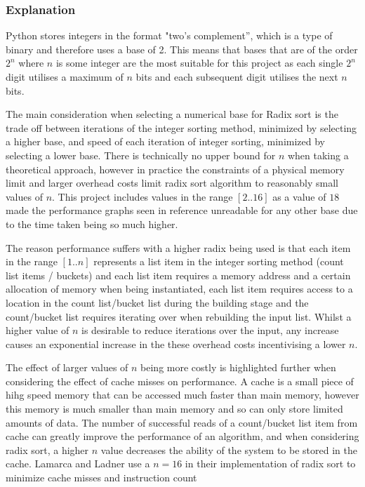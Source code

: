 \documentclass[12pt]{article}
\begin{document}
	\subsubsection{Explanation}
	\label{ssec:radixexplanation}
	Python stores integers in the format "two’s complement”, which is a type of binary and therefore uses a base of 2. This means that bases that are of the order $2^n$ where $n$ is some integer are the most suitable for this project as each single $2^n$ digit utilises a maximum of $n$ bits and each subsequent digit utilises the next $n$ bits.
	\par
	The main consideration when selecting a numerical base for Radix sort is the trade off between iterations of the integer sorting method, minimized by selecting a higher base, and speed of each iteration of integer sorting, minimized by selecting a lower base. There is technically no upper bound for $n$ when taking a theoretical approach, however in practice the constraints of a physical memory limit and larger overhead costs limit radix sort algorithm to reasonably small values of $n$. This project includes values in the range $[2..16]$ as a value of $18$ made the performance graphs seen in {\color{red}reference} unreadable for any other base due to the time taken being so much higher.
	\par 
	The reason performance suffers with a higher radix being used is that each item in the range $[1..n]$ represents a list item in the integer sorting method (count list items / buckets) and each list item requires a memory address and a certain allocation of memory when being instantiated, each list item requires access to a location in the count list/bucket list during the building stage and the count/bucket list requires iterating over when rebuilding the input list. Whilst a higher value of $n$ is desirable to reduce iterations over the input, any increase causes an exponential increase in the these overhead costs incentivising a lower $n$. 
	\par 
	The effect of larger values of $n$ being more costly is highlighted further when considering the effect of cache misses on performance. A cache is a small piece of hihg speed memory that can be accessed much faster than main memory, however this memory is much smaller than main memory and so can only store limited amounts of data. The number of successful reads of a count/bucket list item from cache can greatly improve the performance of an algorithm, and when considering radix sort, a higher $n$ value decreases the ability of the system to be stored in the cache. Lamarca and Ladner use a $n = 16$ in their implementation of radix sort to minimize cache misses and instruction count \cite{LAMARCA199966}
\end{document}
